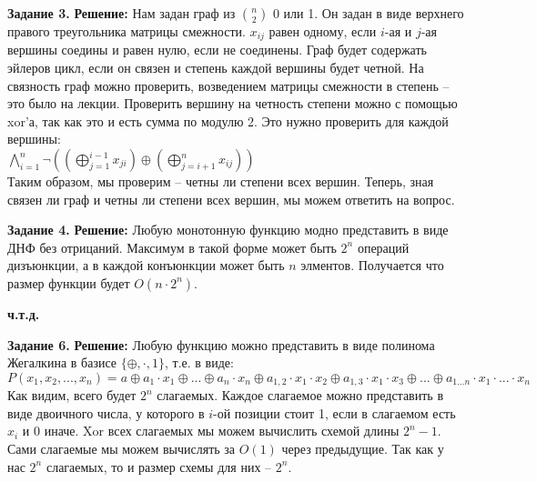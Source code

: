 \documentclass[12pt,a4paper]{scrartcl}
\begin{document}
	\begin{flushright}	
		\textbf{}
	\end{flushright}
	\textbf{Задание 3.} 
	\newline
	\textbf{Решение:} 
	\newline
	\indent
	Нам задан граф из $\binom{n}{2}$ 0 или 1. Он задан в виде верхнего правого треугольника матрицы смежности. $x_{ij}$ равен одному, если $i$-ая и $j$-ая вершины соедины и равен нулю, если не соединены. Граф будет содержать эйлеров цикл, если он связен и степень каждой вершины будет четной. На связность граф можно проверить, возведением матрицы смежности в степень -- это было на лекции. Проверить вершину на четность степени можно с помощью xor'а, так как это и есть сумма по модулю 2. Это нужно проверить для каждой вершины: \\
	$\bigwedge_{i = 1}^{n} \neg((\bigoplus_{j = 1}^{i - 1} x_{ji}) \oplus (\bigoplus_{j = i + 1}^{n} x_{ij}))$\\
	Таким образом, мы проверим -- четны ли степени всех вершин. Теперь, зная связен ли граф и четны ли степени всех вершин, мы можем ответить на вопрос.	
	\begin{flushright}
		\textbf{}
	\end{flushright}
	\noindent
	\textbf{Задание 4.} 
	\newline
	\textbf{Решение:} 
	\newline
	\indent
	Любую монотонную функцию модно представить в виде ДНФ без отрицаний. Максимум в такой форме может быть $2^n$ операций дизъюнкции, а в каждой конъюнкции может быть $n$ элментов. Получается что размер функции будет $O(n \cdot 2^n)$.
	\begin{flushright}
	\textbf{ч.т.д.}
	\end{flushright}
	\noindent
	\textbf{Задание 6.}
	\newline
	\textbf{Решение:}
	\newline
	\indent
	Любую функцию можно представить в виде полинома Жегалкина в базисе $\{\oplus, \cdot, 1 \}$, т.е. в виде:\\
	$P(x_1, x_2, ... , x_n) = a \oplus a_1 \cdot x_1 \oplus ... \oplus a_n \cdot x_n \oplus a_{1,2} \cdot x_1 \cdot x_2 \oplus a_{1,3} \cdot x_1 \cdot x_3 \oplus ... \oplus a_{1...n} \cdot x_1 \cdot ... \cdot x_n$ \\
	Как видим, всего будет $2^n$ слагаемых. Каждое слагаемое можно представить в виде двоичного числа, у которого в $i$-ой позиции стоит 1, если в слагаемом есть $x_i$ и 0 иначе. Xor всех слагаемых мы можем вычислить схемой длины $2^n - 1$. Сами слагаемые мы можем вычислять за $O(1)$ через предыдущие. Так как у нас $2^n$ слагаемых, то и размер схемы для них -- $2^n$.\\
\end{document}
